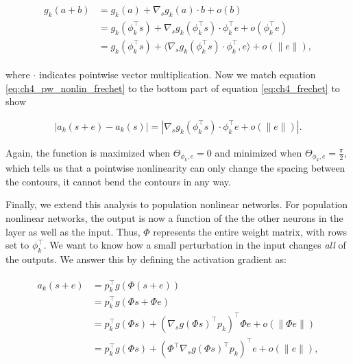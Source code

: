 \begin{align}\label{eq:ch4_pw_nonlin_frechet}
\begin{split}
    g_{k}(a + b) &= g_{k}(a) + \nabla_{s}g_{k}(a) \cdot b + o(b) \\
    &=g_{k}(\phi_{k}^\top s) + \nabla_{s}g_{k}(\phi_{k}^\top s) \cdot \phi_{k}^\top e + o(\phi_{k}^\top e)\\
    &=g_{k}(\phi_{k}^\top s) + \langle\nabla_{s}g_{k}(\phi_{k}^\top s) \cdot \phi_{k}^\top, e\rangle + o(\|e\|),
\end{split}
\end{align}

where $\cdot$ indicates pointwise vector multiplication. Now we match equation \eqref{eq:ch4_pw_nonlin_frechet} to the bottom part of equation \eqref{eq:ch4_frechet} to show 

\begin{equation}
\begin{split}
    |a_{k}(s+e) - a_{k}(s)| = |\nabla_{s}g_{k}(\phi_{k}^\top s) \cdot \phi_{k}^\top e + o(\|e\|)|.
\end{split}
\end{equation}

Again, the function is maximized when $\Theta_{\phi_{k}, e}=0$ and minimized when $\Theta_{\phi_{k}, e}=\tfrac{\pi}{2}$, which tells us that a pointwise nonlinearity can only change the spacing between the contours, it cannot bend the contours in any way.

Finally, we extend this analysis to population nonlinear networks. For population nonlinear networks, the output is now a function of the the other neurons in the layer as well as the input. Thus, $\Phi$ represents the entire weight matrix, with rows set to $\phi_{k}^\top$. We want to know how a small perturbation in the input changes \emph{all} of the outputs. We answer this by defining the activation gradient as:

\begin{align}\label{eq:pop_nonlinear}
\begin{split}
   a_{k}(s+e) &= p_{k}^\top g(\Phi(s+e)) \\
   &= p_{k}^\top g(\Phi s + \Phi e) \\
   &= p_{k}^\top g(\Phi s) + (\nabla_{s}g(\Phi s)^\top p_{k})^\top \Phi e + o(\|\Phi e\|) \\
   &= p_{k}^\top g(\Phi s) + (\Phi^\top \nabla_{s}g(\Phi s)^\top p_{k})^\top e + o(\|e\|),
\end{split}
\end{align}

